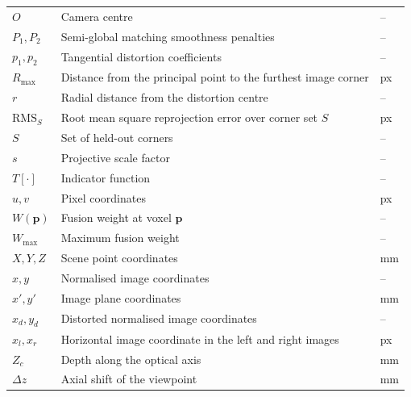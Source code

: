 \begin{tabularx}{\textwidth}{@{}l X U@{}}
$O$                 & Camera centre                                              & -- \\
$P_1, P_2$          & Semi-global matching smoothness penalties                  & -- \\
$p_1, p_2$          & Tangential distortion coefficients                         & -- \\
$R_{\max}$          & Distance from the principal point to the furthest image corner & px \\
$r$                 & Radial distance from the distortion centre                 & -- \\
$\mathrm{RMS}_S$    & Root mean square reprojection error over corner set $S$    & px \\
$S$                 & Set of held-out corners                                    & -- \\
$s$                 & Projective scale factor                                    & -- \\
$T[\cdot]$          & Indicator function                                         & -- \\
$u, v$              & Pixel coordinates                                          & px \\
$W(\mathbf{p})$     & Fusion weight at voxel $\mathbf{p}$                        & -- \\
$W_{\max}$          & Maximum fusion weight                                      & -- \\
$X, Y, Z$           & Scene point coordinates                                    & mm \\
$x, y$              & Normalised image coordinates                               & -- \\
$x', y'$            & Image plane coordinates                                    & mm \\
$x_d, y_d$          & Distorted normalised image coordinates                     & -- \\
$x_l, x_r$          & Horizontal image coordinate in the left and right images   & px \\
$Z_c$               & Depth along the optical axis                               & mm \\
$\Delta z$          & Axial shift of the viewpoint                               & mm \\
\bottomrule
\end{tabularx}

